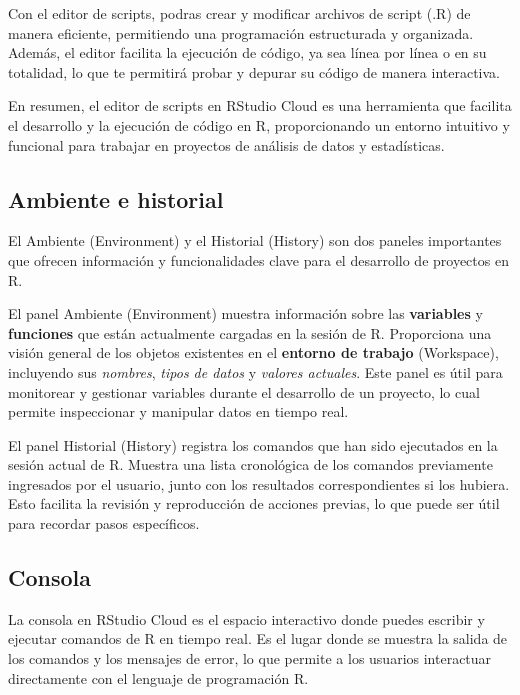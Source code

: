 \documentclass[
]{article}
\begin{document}
Con el editor de scripts, podras crear y modificar archivos de script
(.R) de manera eficiente, permitiendo una programación estructurada y
organizada. Además, el editor facilita la ejecución de código, ya sea
línea por línea o en su totalidad, lo que te permitirá probar y depurar
su código de manera interactiva.

En resumen, el editor de scripts en RStudio Cloud es una herramienta que
facilita el desarrollo y la ejecución de código en R, proporcionando un
entorno intuitivo y funcional para trabajar en proyectos de análisis de
datos y estadísticas.

\subsection{Ambiente e historial}\label{ambiente-e-historial}

El Ambiente (Environment) y el Historial (History) son dos paneles
importantes que ofrecen información y funcionalidades clave para el
desarrollo de proyectos en R.

El panel Ambiente (Environment) muestra información sobre las
\textbf{variables} y \textbf{funciones} que están actualmente cargadas
en la sesión de R. Proporciona una visión general de los objetos
existentes en el \textbf{entorno de trabajo} (Workspace), incluyendo sus
\emph{nombres}, \emph{tipos de datos} y \emph{valores actuales}. Este
panel es útil para monitorear y gestionar variables durante el
desarrollo de un proyecto, lo cual permite inspeccionar y manipular
datos en tiempo real.

El panel Historial (History) registra los comandos que han sido
ejecutados en la sesión actual de R. Muestra una lista cronológica de
los comandos previamente ingresados por el usuario, junto con los
resultados correspondientes si los hubiera. Esto facilita la revisión y
reproducción de acciones previas, lo que puede ser útil para recordar
pasos específicos.

\subsection{Consola}\label{consola}

La consola en RStudio Cloud es el espacio interactivo donde puedes
escribir y ejecutar comandos de R en tiempo real. Es el lugar donde se
muestra la salida de los comandos y los mensajes de error, lo que
permite a los usuarios interactuar directamente con el lenguaje de
programación R.
\end{document}
